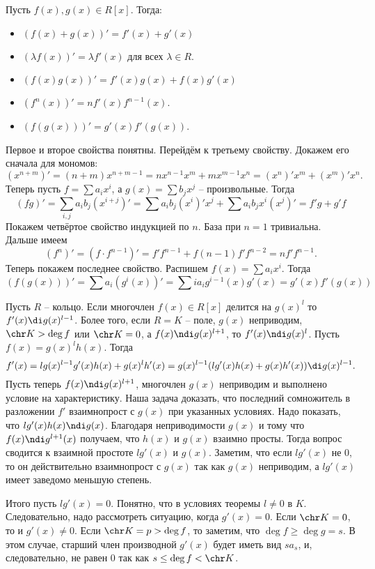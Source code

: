 \thrm[Свойства] Пусть $f(x),g(x) \in R[x]$. Тогда:
\begin{itemize}
\item $(f(x)+g(x))'= f'(x)+g'(x)$
\item $(\lambda f(x))'=\lambda f'(x)$ для всех $\lambda \in R$.
\item  $(f(x)g(x))'=f'(x)g(x)+f(x)g'(x)$
\item $(f^n(x))'=nf'(x)f^{n-1}(x)$.
\item $(f(g(x)))'=g'(x)f'(g(x))$.
\end{itemize}
\ethrm
\proof Первое и второе свойства понятны. Перейдём к третьему свойству. Докажем его сначала для мономов:
$$(x^{n+m})'=(n+m)x^{n+m-1}=nx^{n-1}x^{m}+mx^{m-1}x^n=(x^n)'x^m+(x^{m})'x^n.$$
Теперь пусть $f=\sum a_i x^i$, а $g(x)=\sum b_j x^j$ -- произвольные. Тогда 
$$(fg)'= 
\sum_{i,j} a_ib_j (x^{i+j})'= \sum a_ib_j (x^i)'x^j + \sum a_ib_j x^i(x^j)'=f'g+g'f$$ 
Покажем четвёртое свойство индукцией по $n$. База при $n=1$ тривиальна. Дальше имеем 
$$(f^n)'=(f\cdot f^{n-1})'=f'f^{n-1}+f(n-1)f'f^{n-2}=nf'f^{n-1}.$$
Теперь покажем последнее свойство. Распишем $f(x)=\sum a_i x^i$. Тогда $$(f(g(x)))'=\sum a_i (g^i(x))'= \sum i a_i g^{i-1}(x) g'(x)= g'(x) f'(g(x))$$


\endproof

\thrm Пусть $R$ -- кольцо. Если многочлен $f(x) \in R[x]$ делится на $g(x)^l$ то $f'(x) \di g(x)^{l-1}$. Более того, если $R=K$ -- поле, $g(x)$ неприводим, $\chr K > \deg f$ или $\chr K=0$, а $f(x) \ndi g(x)^{l+1}$, то $f'(x)\ndi g(x)^{l}$.
\ethrm
\proof Пусть $f(x)=g(x)^lh(x)$. Тогда $$f'(x)=lg(x)^{l-1}g'(x)h(x)+g(x)^lh'(x)=g(x)^{l-1}(lg'(x)h(x)+g(x)h'(x)) \di g(x)^{l-1}.$$
Пусть теперь $f(x) \ndi g(x)^{l+1}$, многочлен $g(x)$ неприводим и выполнено условие на характеристику. Наша задача доказать, что последний сомножитель в разложении $f'$ взаимнопрост с $g(x)$ при указанных условиях. Надо показать, что $lg'(x)h(x)\ndi g(x)$. Благодаря неприводимости $g(x)$  и тому что $f(x)\ndi g^{l+1}(x)$ получаем, что $h(x)$ и $g(x)$ взаимно просты.   Тогда вопрос сводится к взаимной простоте $lg'(x)$ и $g(x)$. Заметим, что если $lg'(x)$ не 0, то он действительно взаимнопрост с $g(x)$ так как $g(x)$ неприводим, а $lg'(x)$ имеет заведомо меньшую степень. 

Итого пусть $lg'(x)=0$. Понятно, что в условиях теоремы $l\neq 0$ в $K$. Следовательно, надо рассмотреть ситуацию, когда $g'(x)=0$.
Если $\chr K =0$, то и $g'(x)\neq 0$. Если $\chr K =p>\deg f$, то заметим, что $\deg f \geq \deg g=s$. В этом случае, старший член производной $g'(x)$ будет иметь вид $sa_s$, и, следовательно, не равен 0 так как $s\leq \deg f < \chr K$. 
\endproof



